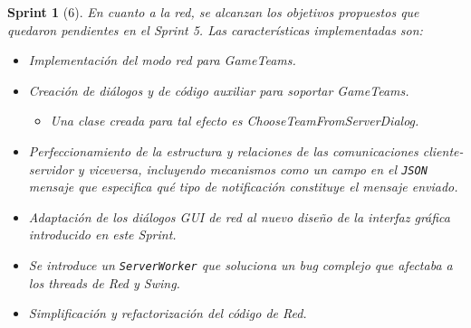 \documentclass[12pt,a4paper,openright]{book}
\theoremstyle{break}
\newtheorem*{sprint}{Sprint}
\begin{document}
\begin{sprint}[6]
En cuanto a la red, se alcanzan los objetivos propuestos que quedaron pendientes en el Sprint 5. Las características implementadas son:

\begin{itemize}
\item Implementación del modo red para GameTeams.

\item Creación de diálogos y de código auxiliar para soportar GameTeams.

\begin{itemize}
\item Una clase creada para tal efecto es ChooseTeamFromServerDialog.
\end{itemize}


\item Perfeccionamiento de la estructura y relaciones de las comunicaciones cliente-servidor y viceversa, incluyendo mecanismos como un campo en el \texttt{JSON} mensaje que especifica qué tipo de notificación constituye el mensaje enviado.

\item Adaptación de los diálogos GUI de red al nuevo diseño de la interfaz gráfica introducido en este Sprint.

\item Se introduce un \texttt{ServerWorker} que soluciona un bug complejo que afectaba a los threads de Red y Swing.

\item Simplificación y refactorización del código de Red.


\end{itemize}
\end{sprint}
\end{document}
